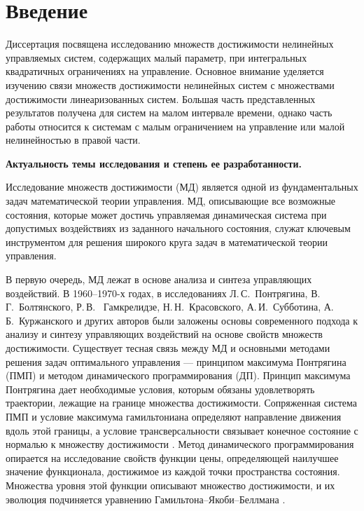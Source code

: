 \documentclass[../main.tex]{subfiles}
\begin{document}
\clearpage
\section*{Введение}
Диссертация посвящена исследованию множеств достижимости нелинейных управляемых систем, содержащих малый параметр, при интегральных квадратичных ограничениях на управление.
Основное внимание уделяется изучению связи множеств достижимости нелинейных систем с множествами достижимости линеаризованных систем. 
Большая часть представленных результатов получена для систем на малом интервале времени, однако часть работы относится к системам с малым ограничением на управление или малой нелинейностью в правой части. 

\textbf{Актуальность темы исследования и степень ее разработанности.} 

Исследование множеств достижимости (МД) является одной из фундаментальных задач математической теории управления. 
МД, описывающие все возможные состояния, которые может достичь управляемая динамическая система при допустимых воздействиях из заданного начального состояния, служат ключевым инструментом для решения широкого круга задач в математической теории управления. 

В первую очередь, МД лежат в основе анализа и синтеза управляющих воздействий. 
В 1960–1970-х годах, в исследованиях Л.\,С.~Понтрягина, В.\,Г.~Болтянского, Р.\,В. ~Гамкрелидзе, Н.\,Н.~Красовского, А.\,И.~Субботина, А.\,Б.~Куржанского и других авторов \cite{Boltyansky, Pontryagin1961, Pontryagin1967, Gamkrelidze, Kras_book, KrasSub, Kurzhanski1977} были заложены основы современного подхода к анализу и синтезу управляющих воздействий на основе свойств множеств достижимости.
Существует тесная связь между МД и основными методами решения задач оптимального управления --- принципом максимума Понтрягина (ПМП) и методом динамического программирования (ДП).
Принцип максимума Понтрягина дает необходимые условия, которым обязаны удовлетворять траектории, лежащие на границе множества достижимости. 
Сопряженная система ПМП и условие максимума гамильтониана определяют направление движения вдоль этой границы, а условие трансверсальности связывает конечное состояние с нормалью к множеству достижимости \cite{Pontryagin1961, Lee}.
Метод динамического программирования опирается на исследование свойств функции цены, определяющей наилучшее значение функционала, достижимое из каждой точки пространства состояния. 
Множества уровня этой функции описывают множество достижимости, и их эволюция подчиняется уравнению Гамильтона–Якоби–Беллмана \cite{Bellman, Kurzhanski1977, GurmanDuhta, Mitchell2002, Osher, Sethian}. 
\end{document}
